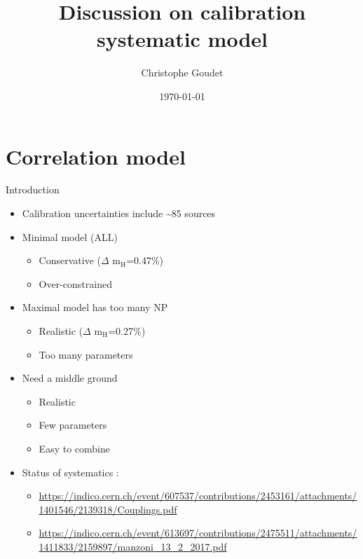 \documentclass[bigger]{beamer}
\author{Christophe Goudet}
\date{\today}
\title{Discussion on calibration systematic model}
\begin{document}
\maketitle



\section{Correlation model}
\label{sec:orgd8ba212}

\begin{frame}[label={sec:org6c9537b}]{Introduction}
\begin{itemize}
\item Calibration uncertainties include \textasciitilde{}85 sources
\item Minimal model (ALL)
\begin{itemize}
\item Conservative (\(\Delta\) m\(_{\text{H}}\)=0.47\%)
\item Over-constrained
\end{itemize}
\item Maximal model has too many NP
\begin{itemize}
\item Realistic (\(\Delta\) m\(_{\text{H}}\)=0.27\%)
\item Too many parameters
\end{itemize}

\item Need a middle ground
\begin{itemize}
\item Realistic
\item Few parameters
\item Easy to combine
\end{itemize}

\item Status of systematics :
\begin{itemize}
\item \url{https://indico.cern.ch/event/607537/contributions/2453161/attachments/1401546/2139318/Couplings.pdf}
\item \url{https://indico.cern.ch/event/613697/contributions/2475511/attachments/1411833/2159897/manzoni\_13\_2\_2017.pdf}
\end{itemize}
\end{itemize}
\end{frame}
\end{document}
